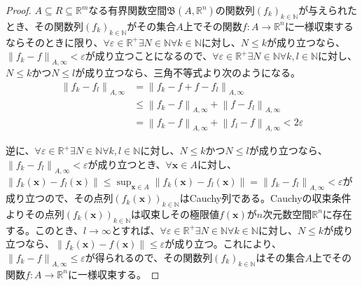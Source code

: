 \documentclass[dvipdfmx]{jsarticle}
\begin{document}
\begin{proof}
$A \subseteq R \subseteq \mathbb{R}^{m}$なる有界関数空間$\mathfrak{B}\left( A,\mathbb{R}^{n} \right)$の関数列$\left( f_{k} \right)_{k \in \mathbb{N}}$が与えられたとき、その関数列$\left( f_{k} \right)_{k \in \mathbb{N}}$がその集合$A$上でその関数$f:A \rightarrow \mathbb{R}^{n}$に一様収束するならそのときに限り、$\forall\varepsilon \in \mathbb{R}^{+}\exists N \in \mathbb{N}\forall k \in \mathbb{N}$に対し、$N \leq k$が成り立つなら、$\left\| f_{k} - f \right\|_{A,\infty} < \varepsilon$が成り立つことになるので、$\forall\varepsilon \in \mathbb{R}^{+}\exists N \in \mathbb{N}\forall k,l \in \mathbb{N}$に対し、$N \leq k$かつ$N \leq l$が成り立つなら、三角不等式より次のようになる。
\begin{align*}
\left\| f_{k} - f_{l} \right\|_{A,\infty} &= \left\| f_{k} - f + f - f_{l} \right\|_{A,\infty}\\
&\leq \left\| f_{k} - f \right\|_{A,\infty} + \left\| f - f_{l} \right\|_{A,\infty}\\
&= \left\| f_{k} - f \right\|_{A,\infty} + \left\| f_{l} - f \right\|_{A,\infty} < 2\varepsilon
\end{align*}\par
逆に、$\forall\varepsilon \in \mathbb{R}^{+}\exists N \in \mathbb{N}\forall k,l \in \mathbb{N}$に対し、$N \leq k$かつ$N \leq l$が成り立つなら、$\left\| f_{k} - f_{l} \right\|_{A,\infty} < \varepsilon$が成り立つとき、$\forall\mathbf{x} \in A$に対し、$\left\| f_{k}\left( \mathbf{x} \right) - f_{l}\left( \mathbf{x} \right) \right\| \leq \sup_{\mathbf{x} \in A}\left\| f_{k}\left( \mathbf{x} \right) - f_{l}\left( \mathbf{x} \right) \right\| = \left\| f_{k} - f_{l} \right\|_{A,\infty} < \varepsilon$が成り立つので、その点列$\left( f_{k}\left( \mathbf{x} \right) \right)_{k \in \mathbb{N}}$はCauchy列である。Cauchyの収束条件よりその点列$\left( f_{k}\left( \mathbf{x} \right) \right)_{k \in \mathbb{N}}$は収束しその極限値$f\left( \mathbf{x} \right)$が$n$次元数空間$\mathbb{R}^{n}$に存在する。このとき、$l \rightarrow \infty$とすれば、$\forall\varepsilon \in \mathbb{R}^{+}\exists N \in \mathbb{N}\forall k \in \mathbb{N}$に対し、$N \leq k$が成り立つなら、$\left\| f_{k}\left( \mathbf{x} \right) - f\left( \mathbf{x} \right) \right\| \leq \varepsilon$が成り立つ。これにより、$\left\| f_{k} - f \right\|_{A,\infty} \leq \varepsilon$が得られるので、その関数列$\left( f_{k} \right)_{k \in \mathbb{N}}$はその集合$A$上でその関数$f:A \rightarrow \mathbb{R}^{n}$に一様収束する。
\end{proof}
\end{document}
